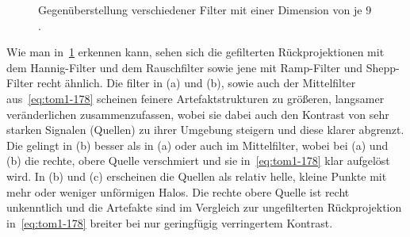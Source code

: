 \documentclass[slug=PET, room=Andreas-Schubert-Bau\,\ 424A,
supervisor=Carsten\ Bittrich, coursedate=10.\ 01.\ 2020, ngerman]{../../Lab_Report_LaTeX/lab_report}
\begin{document}
\begin{figure}[h]
  \centering
  \caption{Gegenüberstellung verschiedener Filter mit einer Dimension
    von je \(9\).}
  \label{fig:filter}
\end{figure}

Wie man in~\ref{fig:filter} erkennen kann, sehen sich die gefilterten
Rückprojektionen mit dem Hannig-Filter und dem Rauschfilter sowie jene
mit Ramp-Filter und Shepp-Filter recht ähnlich. Die filter in (a) und
(b), sowie auch der Mittelfilter aus~\eqref{eq:tom1-178} scheinen
feinere Artefaktstrukturen zu gr\"o\ss{}eren, langsamer
ver\"anderlichen zusammenzufassen, wobei sie dabei auch den Kontrast von
sehr starken Signalen (Quellen) zu ihrer Umgebung steigern und diese
klarer abgrenzt. Die gelingt in (b) besser als in (a) oder auch im
Mittelfilter, wobei bei (a) und (b) die rechte, obere Quelle
verschmiert und sie in~\eqref{eq:tom1-178} klar aufgel\"ost wird. In (b)
und (c) erscheinen die Quellen als relativ helle, kleine Punkte mit
mehr oder weniger unf\"ormigen Halos. Die rechte obere Quelle ist
recht unkenntlich und die Artefakte sind im Vergleich zur
ungefilterten R\"uckprojektion in~\eqref{eq:tom1-178} breiter bei nur
geringf\"ugig verringertem Kontrast. \\
\end{document}
